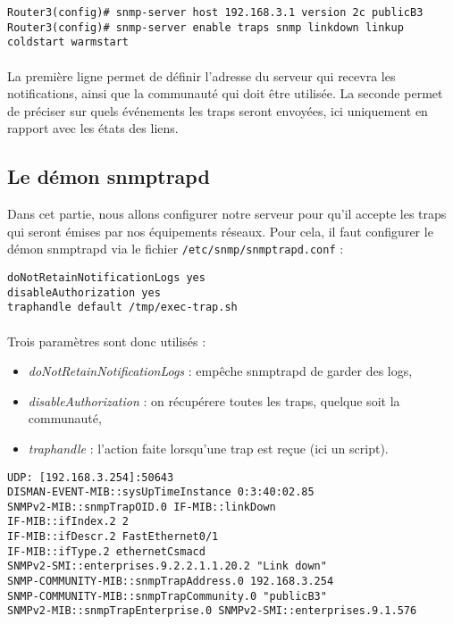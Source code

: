 \documentclass[12pt,a4paper,notitlepage]{article}
\begin{document}
\begin{lstlisting}[title=Activation des traps pour l'état des liens]
Router3(config)# snmp-server host 192.168.3.1 version 2c publicB3
Router3(config)# snmp-server enable traps snmp linkdown linkup coldstart warmstart
\end{lstlisting}

\paragraph{} La première ligne permet de définir l'adresse du serveur qui recevra les notifications, ainsi que la communauté qui doit être utilisée. La seconde permet de préciser sur quels événements les traps seront envoyées, ici uniquement en rapport avec les états des liens.

\subsection{Le démon snmptrapd}
Dans cet partie, nous allons configurer notre serveur pour qu'il accepte les traps qui seront émises par nos équipements réseaux. Pour cela, il faut configurer le démon snmptrapd via le fichier \texttt{/etc/snmp/snmptrapd.conf} :

\begin{lstlisting}[title=Configuration de snmptrapd]
doNotRetainNotificationLogs yes
disableAuthorization yes
traphandle default /tmp/exec-trap.sh
\end{lstlisting}

\paragraph{} Trois paramètres sont donc utilisés : 
\begin{itemize}
\item \textit{doNotRetainNotificationLogs} : empêche snmptrapd de garder des logs,
\item \textit{disableAuthorization} : on récupérere toutes les traps, quelque soit la communauté,
\item \textit{traphandle} : l'action faite lorsqu'une trap est reçue (ici un script).
\end{itemize}\bigskip

\begin{lstlisting}[title=Exemple de trap reçue]
UDP: [192.168.3.254]:50643
DISMAN-EVENT-MIB::sysUpTimeInstance 0:3:40:02.85
SNMPv2-MIB::snmpTrapOID.0 IF-MIB::linkDown
IF-MIB::ifIndex.2 2
IF-MIB::ifDescr.2 FastEthernet0/1
IF-MIB::ifType.2 ethernetCsmacd
SNMPv2-SMI::enterprises.9.2.2.1.1.20.2 "Link down"
SNMP-COMMUNITY-MIB::snmpTrapAddress.0 192.168.3.254
SNMP-COMMUNITY-MIB::snmpTrapCommunity.0 "publicB3"
SNMPv2-MIB::snmpTrapEnterprise.0 SNMPv2-SMI::enterprises.9.1.576
\end{lstlisting}
\end{document}
